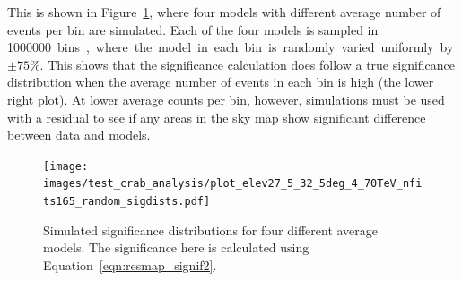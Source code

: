 This is shown in Figure~\ref{fig:various_sig_dists}, where four models with different average number of events per bin are simulated.
Each of the four models is sampled in \SI{1000000} bins, where the model in each bin is randomly varied uniformly by $\pm 75\%$.
This shows that the significance calculation does follow a true significance distribution when the average number of events in each bin is high (the lower right plot).
At lower average counts per bin, however, simulations must be used with a residual to see if any areas in the sky map show significant difference between data and models.

\begin{figure}[h]
  \centering
  \texttt{[image: images/test\_crab\_analysis/plot\_elev27\_5\_32\_5deg\_4\_70TeV\_nfits165\_random\_sigdists.pdf]}
  \caption[4 Simulated Significance Distributions]{
    Simulated significance distributions for four different average models.
    The significance here is calculated using Equation~\ref{eqn:resmap_signif2}.
  }
  \label{fig:various_sig_dists}
\end{figure}

